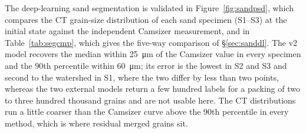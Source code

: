 \documentclass[preprint,12pt,numbers]{elsarticle}
\begin{document}
  The deep-learning sand segmentation is validated in Figure~\ref{fig:sandpsd},
  which compares the CT grain-size distribution of each sand specimen (S1--S3) at
  the initial state against the independent Camsizer measurement, and in
  Table~\ref{tab:segcmp}, which gives the five-way comparison of
  \S\ref{sec:sanddl}.  The v2 model recovers the median within
  \SI{25}{\micro\meter} of the Camsizer value in every specimen and the
  90th percentile within \SI{60}{\micro\meter}; its error is the lowest in S2
  and S3 and second to the watershed in S1, where the two differ by less than
  two points, whereas the two external models return a few hundred labels for
  a packing of two to three hundred thousand grains and are not usable here.
  The CT distributions run a little coarser than the Camsizer curve above the
  90th percentile in every method, which is where residual merged grains sit.
\end{document}
